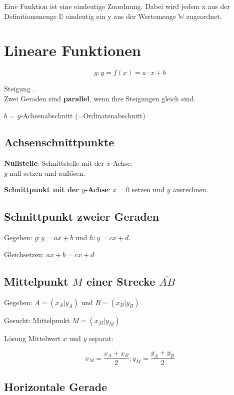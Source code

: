 \begin{multicols}{2}
Eine Funktion ist eine {\color{red} eindeutige Zuordnung}. Dabei wird jedem {\color{FarnFarbe}x} aus der {\color{FarnFarbe}Definitionsmenge $\mathbb{D}$} eindeutig ein {\color{blue}y} aus der {\color{blue}Wertemenge $\mathbb{W}$} zugeordnet.



\hrulefill
\section*{Lineare Funktionen}

$$g: y = f(x) = a\cdot{}x + b$$

Steigung .\\
Zwei Geraden sind \textbf{parallel}, wenn ihre Steigungen gleich sind.

$b$ = $y$-Achsenabschnitt (=Ordinatenabschnitt)

\subsection*{Achsenschnittpunkte}

\textbf{Nullstelle}: Schnittstelle mit der $x$-Achse:\\ $y$ null setzen und auf\/lösen.

\textbf{Schnittpunkt mit der $y$-Achse}: 
$x=0$ setzen und $y$ ausrechnen.


\subsection*{Schnittpunkt zweier Geraden}
Gegeben: $g: y=ax+b$ und $h: y=cx+d$.

Gleichsetzen: $ax+b = cx+d$


\subsection*{Mittelpunkt $M$ einer Strecke $\overline{AB}$}
Gegeben: $A=(x_A|y_A)$ und $B=(x_B|y_B)$

Gesucht: Mittelpunkt $M=(x_M|y_M)$

Lösung Mittelwert $x$ und $y$ separat:

$$x_M = \frac{x_A+x_B}2; y_M=\frac{y_A+y_B}2$$

\subsection*{Horizontale Gerade}


\end{multicols}
